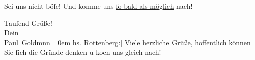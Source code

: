 \pstart
           {\pb}Sei uns nicht böſe! Und komme uns \uline{ſo bald als möglich} nach!\pend
           
\pstart
           Tauſend Grüße! {\\[\baselineskip]}Dein {\\[\baselineskip]}\spacefill\mbox{Paul Goldmnn}\pend
           \leftskip=0em{}
\pstart
           \noindent{}{[}hs. Rottenberg:{]} Viele herzliche Grüße, hoffentlich können Sie ſich
                  die Gründe denken u ko{\geminationm}en uns gleich nach! –\pend
           \endnumbering{}
\begin{anhang}
\end{anhang}
      
